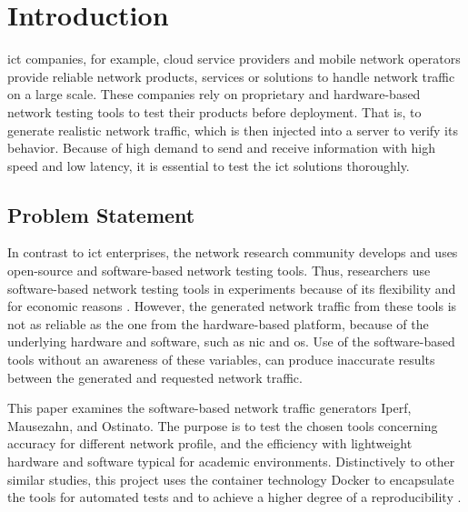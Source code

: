 \chapter{Introduction}\label{introduction}

\acrfull{ict} companies, for example, cloud service providers and mobile network operators provide reliable network products, services or solutions to handle network traffic on a large scale.
These companies rely on proprietary and hardware-based network testing tools to test their products before deployment.
That is, to generate realistic network traffic, which is then injected into a server to verify its behavior.
Because of high demand to send and receive information with high speed and low latency, it is essential to test the \gls{ict} solutions thoroughly.

%
%
\section{Problem Statement}

In contrast to \gls{ict} enterprises, the network research community develops and uses open-source and software-based network testing tools.
Thus, researchers use software-based network testing tools \cite{DITGDist48:online, Packetge32:online, ToolsThe22:online} in experiments because of its flexibility and for economic reasons \cite{botta2010you, molnar2013validate}.
However, the generated network traffic from these tools is not as reliable as the one from the hardware-based platform, because of the underlying hardware and software, such as \gls{nic} and \gls{os}.
Use of the software-based tools without an awareness of these variables, can produce inaccurate results between the generated and requested network traffic.

\skippara This paper examines the software-based network traffic generators Iperf, Mausezahn, and Ostinato.
The purpose is to test the chosen tools concerning accuracy for different network profile, and the efficiency with lightweight hardware and software typical for academic environments.
Distinctively to other similar studies, this project uses the container technology Docker to encapsulate the tools for automated tests and to achieve a higher degree of a reproducibility \cite{piccolo2016tools, boettiger2015introduction, Chamberlain2014}.

%
%
